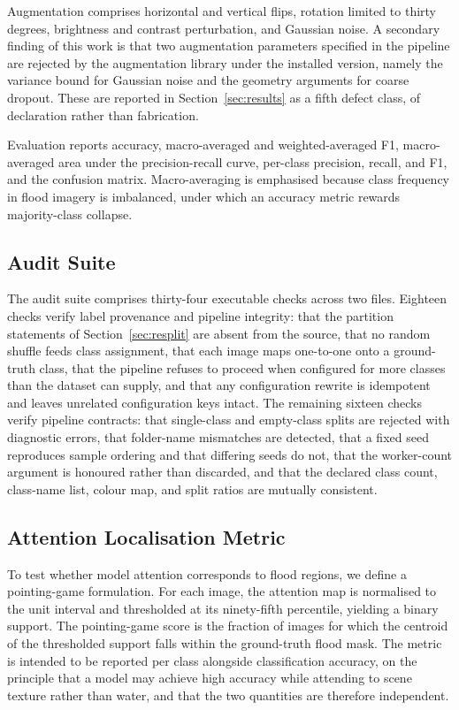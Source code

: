 Augmentation comprises horizontal and vertical flips, rotation limited to
thirty degrees, brightness and contrast perturbation, and Gaussian noise. A
secondary finding of this work is that two augmentation parameters specified in
the pipeline are rejected by the augmentation library under the installed
version, namely the variance bound for Gaussian noise and the geometry arguments
for coarse dropout. These are reported in Section~\ref{sec:results} as a fifth
defect class, of declaration rather than fabrication.

Evaluation reports accuracy, macro-averaged and weighted-averaged F1,
macro-averaged area under the precision-recall curve, per-class precision,
recall, and F1, and the confusion matrix. Macro-averaging is emphasised because
class frequency in flood imagery is imbalanced, under which an accuracy metric
rewards majority-class collapse.

\subsection{Audit Suite}

The audit suite comprises thirty-four executable checks across two files.
Eighteen checks verify label provenance and pipeline integrity: that the
partition statements of Section~\ref{sec:resplit} are absent from the source,
that no random shuffle feeds class assignment, that each image maps one-to-one
onto a ground-truth class, that the pipeline refuses to proceed when configured
for more classes than the dataset can supply, and that any configuration
rewrite is idempotent and leaves unrelated configuration keys intact. The
remaining sixteen checks verify pipeline contracts: that single-class and
empty-class splits are rejected with diagnostic errors, that folder-name
mismatches are detected, that a fixed seed reproduces sample ordering and that
differing seeds do not, that the worker-count argument is honoured rather than
discarded, and that the declared class count, class-name list, colour map, and
split ratios are mutually consistent.

\subsection{Attention Localisation Metric}
\label{sec:pointinggame}

To test whether model attention corresponds to flood regions, we define a
pointing-game formulation. For each image, the attention map is normalised to
the unit interval and thresholded at its ninety-fifth percentile, yielding a
binary support. The pointing-game score is the fraction of images for which the
centroid of the thresholded support falls within the ground-truth flood mask.
The metric is intended to be reported per class alongside classification
accuracy, on the principle that a model may achieve high accuracy while
attending to scene texture rather than water, and that the two quantities are
therefore independent.

